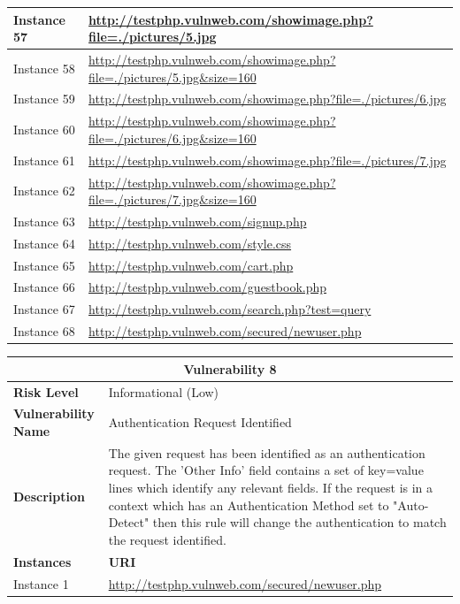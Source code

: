 \documentclass[12pt]{article}
\begin{document}
\begin{center}
\begin{longtable}{|l|p{10cm}|}
\hline
Instance 57 & \url{http://testphp.vulnweb.com/showimage.php?file=./pictures/5.jpg} \\
\hline
Instance 58 & \url{http://testphp.vulnweb.com/showimage.php?file=./pictures/5.jpg\&size=160} \\
\hline
Instance 59 & \url{http://testphp.vulnweb.com/showimage.php?file=./pictures/6.jpg} \\
\hline
Instance 60 & \url{http://testphp.vulnweb.com/showimage.php?file=./pictures/6.jpg\&size=160} \\
\hline
Instance 61 & \url{http://testphp.vulnweb.com/showimage.php?file=./pictures/7.jpg} \\
\hline
Instance 62 & \url{http://testphp.vulnweb.com/showimage.php?file=./pictures/7.jpg\&size=160} \\
\hline
Instance 63 & \url{http://testphp.vulnweb.com/signup.php} \\
\hline
Instance 64 & \url{http://testphp.vulnweb.com/style.css} \\
\hline
Instance 65 & \url{http://testphp.vulnweb.com/cart.php} \\
\hline
Instance 66 & \url{http://testphp.vulnweb.com/guestbook.php} \\
\hline
Instance 67 & \url{http://testphp.vulnweb.com/search.php?test=query} \\
\hline
Instance 68 & \url{http://testphp.vulnweb.com/secured/newuser.php} \\
\hline
\end{longtable}
\end{center}\vspace{0.7cm}
\begin{center}
\renewcommand{\arraystretch}{1.3}
\begin{longtable}{|l|p{10cm}|}
\hline
\multicolumn{2}{|c|}{\textbf{Vulnerability 8}} \\
\hline
\textbf{Risk Level} & Informational (Low) \\
\hline
\textbf{Vulnerability Name} & Authentication Request Identified \\
\hline
\textbf{Description} & The given request has been identified as an authentication request. The 'Other Info' field contains a set of key=value lines which identify any relevant fields. If the request is in a context which has an Authentication Method set to "Auto-Detect" then this rule will change the authentication to match the request identified. \\
\hline
\textbf{Instances} & \textbf{URI} \\
\hline
Instance 1 & \url{http://testphp.vulnweb.com/secured/newuser.php} \\
\hline
\end{longtable}
\end{center}\vspace{0.7cm}
\end{document}

